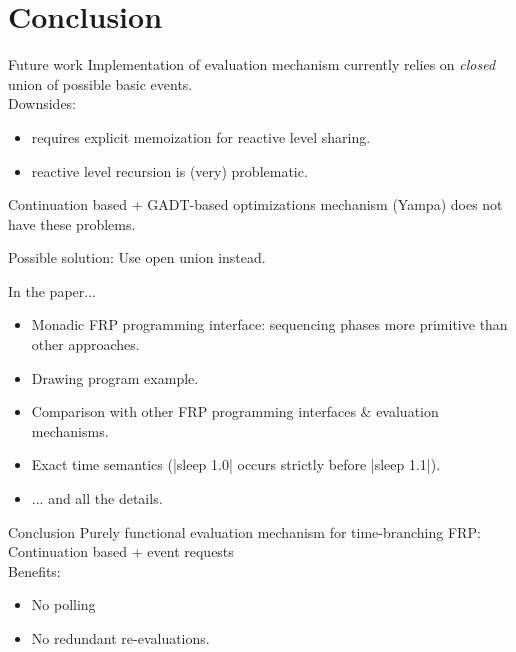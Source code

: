 \documentclass{beamer}
\begin{document}
\section{Conclusion}


\begin{frame}{Future work}
Implementation of evaluation mechanism currently relies on \emph{closed} union of possible basic events.\\
Downsides:
\begin{itemize}
\item requires explicit memoization for reactive level sharing.
\item reactive level recursion is (very) problematic.
\end{itemize}
Continuation based + GADT-based optimizations mechanism (Yampa) does not have these problems.\\

\vspace{0.5cm}

Possible solution: Use open union instead.
\end{frame}

\begin{frame}{In the paper...}
\begin{itemize}
\item Monadic FRP programming interface: sequencing phases more primitive than other approaches.
\item Drawing program example.
\item Comparison with other FRP programming interfaces \& evaluation mechanisms.
\item Exact time semantics (|sleep 1.0| occurs strictly before |sleep 1.1|).

\item ... and all the details.
\end{itemize}

\end{frame}











\begin{frame}{Conclusion}
\noindent Purely functional evaluation mechanism for time-branching FRP:\\
\hspace{0.5cm}Continuation based + event requests\\
Benefits:
\begin{itemize}
\item No polling
\item No redundant re-evaluations.
\end{itemize}
\end{frame}
\newcommand{\backupbegin}{
   \newcounter{framenumberappendix}
   \setcounter{framenumberappendix}{\value{framenumber}}
}
\newcommand{\backupend}{
   \addtocounter{framenumberappendix}{-\value{framenumber}}
   \addtocounter{framenumber}{\value{framenumberappendix}} 
}
\appendix
\backupbegin
\end{document}
